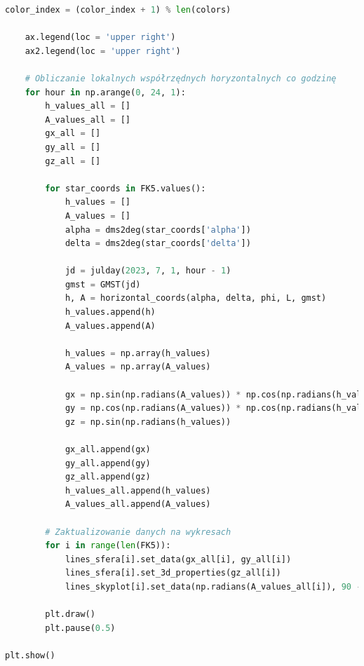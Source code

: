 \documentclass[fleqn,10pt,a4paper]{article}
\begin{document}
\begin{lstlisting}[language=Python, caption=Animacja położenia gwiazd Wielkiego Wozu, label = kod4]
        color_index = (color_index + 1) % len(colors)
        
    ax.legend(loc = 'upper right')
    ax2.legend(loc = 'upper right')
    
    # Obliczanie lokalnych współrzędnych horyzontalnych co godzinę
    for hour in np.arange(0, 24, 1):
        h_values_all = []
        A_values_all = []
        gx_all = []
        gy_all = []
        gz_all = []
        
        for star_coords in FK5.values():
            h_values = []
            A_values = []
            alpha = dms2deg(star_coords['alpha'])
            delta = dms2deg(star_coords['delta'])
            
            jd = julday(2023, 7, 1, hour - 1) 
            gmst = GMST(jd)
            h, A = horizontal_coords(alpha, delta, phi, L, gmst)
            h_values.append(h)
            A_values.append(A)

            h_values = np.array(h_values)
            A_values = np.array(A_values)
                
            gx = np.sin(np.radians(A_values)) * np.cos(np.radians(h_values))
            gy = np.cos(np.radians(A_values)) * np.cos(np.radians(h_values))
            gz = np.sin(np.radians(h_values))
            
            gx_all.append(gx)
            gy_all.append(gy)
            gz_all.append(gz)
            h_values_all.append(h_values)
            A_values_all.append(A_values)
            
        # Zaktualizowanie danych na wykresach
        for i in range(len(FK5)):
            lines_sfera[i].set_data(gx_all[i], gy_all[i])
            lines_sfera[i].set_3d_properties(gz_all[i])
            lines_skyplot[i].set_data(np.radians(A_values_all[i]), 90 - h_values_all[i])
        
        plt.draw()
        plt.pause(0.5)

plt.show()
\end{lstlisting}

\listoftables
\listoffigures
\lstlistoflistings
\end{document}
